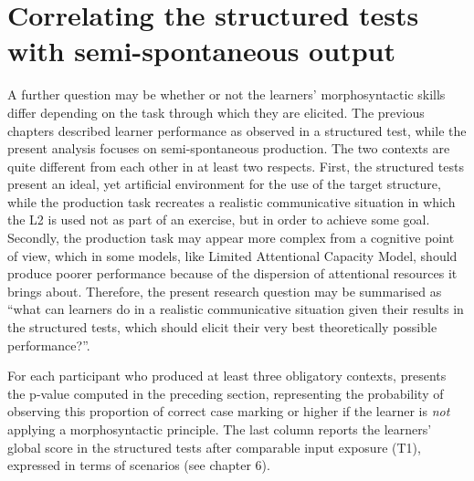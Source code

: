 \section{Correlating the structured tests with semi-spontaneous output}\label{sec:07:4}

A further question may be whether or not the learners’ morphosyntactic skills differ depending on the task through which they are elicited. The previous chapters described learner performance as observed in a structured test, while the present analysis focuses on semi-spontaneous production. The two contexts are quite different from each other in at least two respects. First, the structured tests present an ideal, yet artificial environment for the use of the target structure, while the production task recreates a realistic communicative situation in which the L2 is used not as part of an exercise, but in order to achieve some goal. Secondly, the production task may appear more complex from a cognitive point of view, which in some models, like  Limited Attentional Capacity Model, should produce poorer performance because of the dispersion of attentional resources it brings about. Therefore, the present research question may be summarised as “what can learners do in a realistic communicative situation given their results in the structured tests, which should elicit their very best theoretically possible performance?”. 

For each participant who produced at least three obligatory contexts,  presents the p-value computed in the preceding section, representing the probability of observing this proportion of correct case marking or higher if the learner is \textit{not} applying a morphosyntactic principle. The last column reports the learners’ global score in the structured tests after comparable input exposure (T1), expressed in terms of scenarios (see chapter 6).

